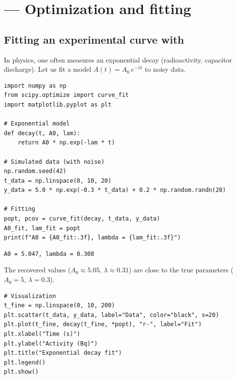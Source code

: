 \section{ --- Optimization and fitting}

\subsection{Fitting an experimental curve with }

In physics, one often measures an exponential decay (radioactivity,
capacitor discharge). Let us fit a model $A(t) = A_0 \, e^{-\lambda t}$
to noisy data.

\begin{codeblock}[title=\textbf{Python}]
\begin{verbatim}
import numpy as np
from scipy.optimize import curve_fit
import matplotlib.pyplot as plt

# Exponential model
def decay(t, A0, lam):
    return A0 * np.exp(-lam * t)

# Simulated data (with noise)
np.random.seed(42)
t_data = np.linspace(0, 10, 20)
y_data = 5.0 * np.exp(-0.3 * t_data) + 0.2 * np.random.randn(20)

# Fitting
popt, pcov = curve_fit(decay, t_data, y_data)
A0_fit, lam_fit = popt
print(f"A0 = {A0_fit:.3f}, lambda = {lam_fit:.3f}")
\end{verbatim}
\end{codeblock}

\begin{codeoutput}
\begin{verbatim}
A0 = 5.047, lambda = 0.308
\end{verbatim}
\end{codeoutput}

The recovered values ($A_0 \approx 5.05$, $\lambda \approx 0.31$) are close
to the true parameters ($A_0 = 5$, $\lambda = 0.3$).

\begin{codeblock}[title=\textbf{Python}]
\begin{verbatim}
# Visualization
t_fine = np.linspace(0, 10, 200)
plt.scatter(t_data, y_data, label="Data", color="black", s=20)
plt.plot(t_fine, decay(t_fine, *popt), "r-", label="Fit")
plt.xlabel("Time (s)")
plt.ylabel("Activity (Bq)")
plt.title("Exponential decay fit")
plt.legend()
plt.show()
\end{verbatim}
\end{codeblock}

